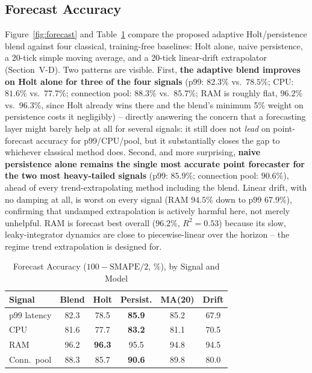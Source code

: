 \documentclass[conference]{IEEEtran}
\begin{document}
\subsection{Forecast Accuracy}
Figure~\ref{fig:forecast} and Table~\ref{tab:forecast} compare the proposed adaptive Holt/persistence
blend against four classical, training-free baselines: Holt alone, naive persistence, a 20-tick simple
moving average, and a 20-tick linear-drift extrapolator (Section~V-D). Two patterns are visible. First,
\textbf{the adaptive blend improves on Holt alone for three of the four signals} (p99: $82.3\%$ vs.\
$78.5\%$; CPU: $81.6\%$ vs.\ $77.7\%$; connection pool: $88.3\%$ vs.\ $85.7\%$; RAM is roughly flat,
$96.2\%$ vs.\ $96.3\%$, since Holt already wins there and the blend's minimum 5\% weight on persistence
costs it negligibly) -- directly answering the concern that a forecasting layer might barely help at
all for several signals: it still does not \emph{lead} on point-forecast accuracy for p99/CPU/pool, but
it substantially closes the gap to whichever classical method does. Second, and more surprising,
\textbf{naive persistence alone remains the single most accurate point forecaster for the two most
heavy-tailed signals} (p99: $85.9\%$; connection pool: $90.6\%$), ahead of every trend-extrapolating
method including the blend. Linear drift, with no damping at all, is worst on every signal
(RAM $94.5\%$ down to p99 $67.9\%$), confirming that undamped extrapolation is actively harmful here,
not merely unhelpful. RAM is forecast best overall ($96.2\%$, $R^2=0.53$) because its slow,
leaky-integrator dynamics are close to piecewise-linear over the horizon -- the regime trend
extrapolation is designed for.

\begin{table}[t]
\centering
\caption{Forecast Accuracy ($100-\mathrm{SMAPE}/2$, \%), by Signal and Model}
\label{tab:forecast}
\begin{tabular}{lccccc}
\toprule
Signal & Blend & Holt & Persist. & MA(20) & Drift \\
\midrule
p99 latency & 82.3 & 78.5 & \textbf{85.9} & 85.2 & 67.9 \\
CPU & 81.6 & 77.7 & \textbf{83.2} & 81.1 & 70.5 \\
RAM & 96.2 & \textbf{96.3} & 95.5 & 94.8 & 94.5 \\
Conn.\ pool & 88.3 & 85.7 & \textbf{90.6} & 89.8 & 80.0 \\
\bottomrule
\end{tabular}
\end{table}
\end{document}
